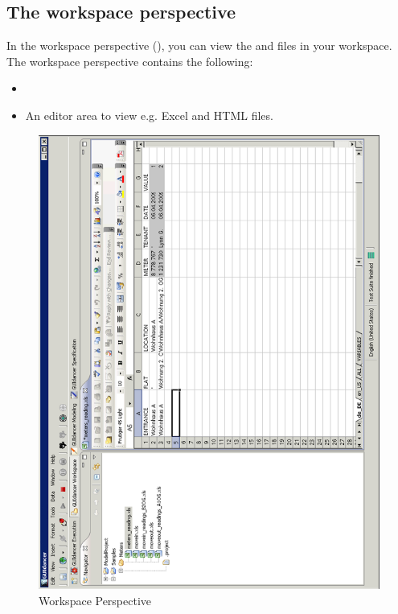 \subsection{The workspace perspective}


In the workspace perspective (), you can view the \gdprojects{} and files in your workspace. The workspace perspective contains the following:


\begin{itemize}
\item \gdnavview{} 
\item An editor area to view e.g. Excel and HTML files.
\end{itemize}

\begin{figure}
\includegraphics{Userinterface/Editors/PS/workspaceperspective}
\caption{Workspace Perspective}
\label{workspaceperspective}
\end{figure}
\clearpage


